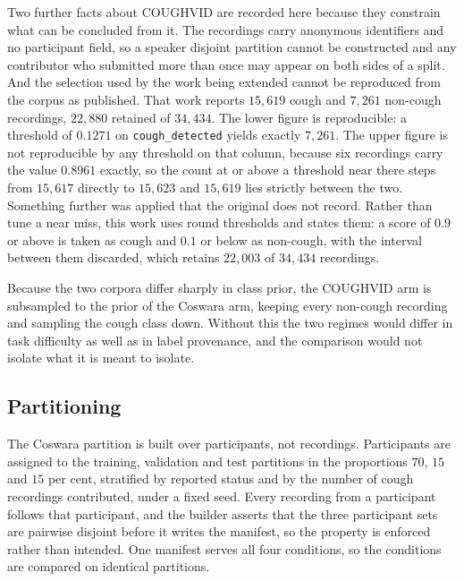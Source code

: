 Two further facts about COUGHVID are recorded here because they constrain what can be
concluded from it. The recordings carry anonymous identifiers and no participant field,
so a speaker disjoint partition cannot be constructed and any contributor who submitted
more than once may appear on both sides of a split. And the selection used by the work
being extended cannot be reproduced from the corpus as published. That work reports
$15{,}619$ cough and $7{,}261$ non-cough recordings, $22{,}880$ retained of $34{,}434$.
The lower figure is reproducible: a threshold of $0.1271$ on \texttt{cough\_detected}
yields exactly $7{,}261$. The upper figure is not reproducible by any threshold on that
column, because six recordings carry the value $0.8961$ exactly, so the count at or above
a threshold near there steps from $15{,}617$ directly to $15{,}623$ and $15{,}619$ lies
strictly between the two. Something further was applied that the original does not
record. Rather than tune a near miss, this work uses round thresholds and states them:
a score of $0.9$ or above is taken as cough and $0.1$ or below as non-cough, with the
interval between them discarded, which retains $22{,}003$ of $34{,}434$ recordings.

Because the two corpora differ sharply in class prior, the COUGHVID arm is subsampled to
the prior of the Coswara arm, keeping every non-cough recording and sampling the cough
class down. Without this the two regimes would differ in task difficulty as well as in
label provenance, and the comparison would not isolate what it is meant to isolate.

\subsection{Partitioning}\label{sec:setup-split}

The Coswara partition is built over participants, not recordings. Participants are
assigned to the training, validation and test partitions in the proportions $70$, $15$ and
$15$ per cent, stratified by reported status and by the number of cough recordings
contributed, under a fixed seed. Every recording from a participant follows that
participant, and the builder asserts that the three participant sets are pairwise
disjoint before it writes the manifest, so the property is enforced rather than intended.
One manifest serves all four conditions, so the conditions are compared on identical
partitions.

